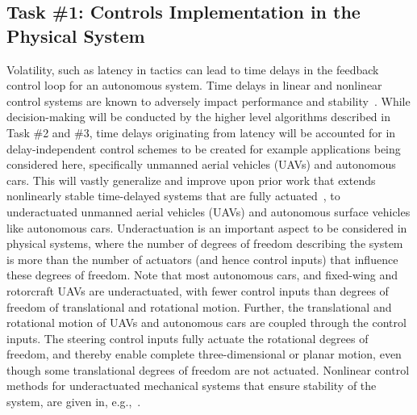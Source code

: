 \documentclass[11pt]{proposalnsf}
\newcommand{\dan}[1]{\textcolor{blue}{{\it [Dan says: #1]}}}
\begin{document}
\begin{sloppypar}
       


	





\subsection*{Task \#1: Controls Implementation in the Physical System}
Volatility, such as latency in tactics can lead to time delays in the feedback control loop for an autonomous system. Time delays in linear and nonlinear control systems are known to adversely impact performance and stability~\cite{Chunodkar, Samiei, Gu, Samiei2012, ebsp15}. While decision-making will be conducted by the higher level algorithms described in Task \#2 and \#3, time delays originating from latency will be accounted for in delay-independent control schemes to be created for example applications being considered here, specifically unmanned aerial vehicles (UAVs) and autonomous cars. This will vastly generalize and improve upon prior work that extends nonlinearly stable time-delayed systems that are fully actuated~\cite{Samiei2012, ebsp15}, to underactuated unmanned aerial vehicles (UAVs) and autonomous surface vehicles like autonomous cars. Underactuation is an important aspect to be considered in physical systems, where the number of degrees of freedom describing the system is more than the number of actuators (and hence control inputs) that influence these degrees of freedom. Note that most autonomous cars, and fixed-wing and rotorcraft UAVs are underactuated, with fewer control inputs than degrees of freedom of translational and rotational motion. Further, the translational and rotational motion of UAVs and autonomous cars are coupled through the control inputs. The steering control inputs fully actuate the rotational degrees of freedom, and thereby enable complete three-dimensional or planar motion, even though some translational degrees of freedom are not actuated. Nonlinear control methods for  underactuated mechanical systems that ensure stability of the system, are given in, e.g.,~\cite{bullo2004geometric,khalil:2002:nonlinear}. 



\end{sloppypar}
\end{document}
